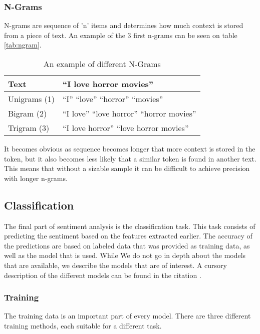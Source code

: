 \subsubsection{N-Grams}
N-grams are sequence of 'n' items and determines how much context is stored
from a piece of text. An example of the 3 first n-grams can be seen on table
\autoref{tab:ngram}. 

\begin{table}[H]
\centering
\begin{tabular}{|l|l|}
\hline
Text & ``I love horror movies'' \\ \hline
Unigrams (1) &
``I'' ``love'' ``horror'' ``movies''
\\ \hline 
Bigram (2) &
``I love'' ``love horror'' ``horror movies''
\\ \hline
Trigram (3) &
``I love horror'' ``love horror movies''
\\ \hline
\end{tabular}
\caption{An example of different N-Grams}
\label{tab:ngram}
\end{table}

It becomes obvious as sequence becomes longer that more context is stored in the
token, but it also becomes less likely that a similar token is found in another
text. This means that without a sizable sample it can be difficult to achieve
precision with longer n-grams.

\subsection{Classification}
The final part of sentiment analysis is the classification task. This task
consists of predicting the sentiment based on the features extracted earlier.
The accuracy of the predictions are based on labeled data that was provided as
training data, as well as the model that is used. While We do not go in depth
about the models that are available, we describe the models that are of
interest. A cursory description of the different models can be found in the
citation \citep{Classification}.

\subsubsection{Training}
The training data is an important part of every model. There are three different
training methods, each suitable for a different task. 

